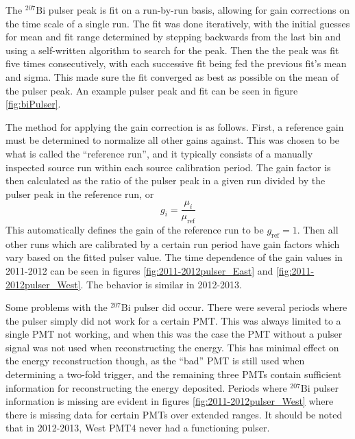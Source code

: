 The $^{207}\mathrm{Bi}$ pulser peak is fit on a run-by-run basis, allowing for gain corrections on the time
scale of a single run. The fit was done iteratively, with the initial guesses for mean and fit range determined
by stepping backwards from the last bin and using a self-written algorithm to search for the peak. Then the the peak
was fit five times consecutively, with each successive fit being fed the previous fit's mean and sigma. This
made sure the fit converged as best as possible on the mean of the pulser peak. An example pulser peak and fit
can be seen in figure \ref{fig:biPulser}.

The method for applying the gain correction is as follows. First, a reference gain must be determined
to normalize all other gains against. This was chosen to be what is called the ``reference run'', and it
typically consists of a manually inspected source run within each source calibration period. The gain factor
is then calculated as the ratio of the pulser peak in a given run divided by the pulser peak in the reference
run, or
%
\begin{equation}
  g_i = \frac{\mu_i}{\mu_{\mathrm{ref}}}
\end{equation}
%
This automatically defines the gain of the reference run to be $g_{\mathrm{ref}}=1$. Then all other runs which are
calibrated by a certain run period have gain factors which vary based on the fitted pulser value. The time
dependence of the gain values in 2011-2012 can be seen in figures \ref{fig:2011-2012pulser_East}
and \ref{fig:2011-2012pulser_West}. The behavior is similar in 2012-2013.

Some problems with the $^{207}\mathrm{Bi}$ pulser did occur. There were several periods where the pulser
simply did not work for a certain PMT. This was always limited to a single PMT not working, and when this
was the case the PMT without a pulser signal was not used when reconstructing the energy. This has
minimal effect on the energy reconstruction though, as the ``bad'' PMT is still used when determining
a two-fold trigger, and the remaining three PMTs contain sufficient information for reconstructing the
energy deposited. Periods where $^{207}\mathrm{Bi}$ pulser information is missing are evident in
figures \ref{fig:2011-2012pulser_West} where there is missing data for certain PMTs over extended ranges.
It should be noted that in 2012-2013, West PMT4 never had a functioning pulser.

